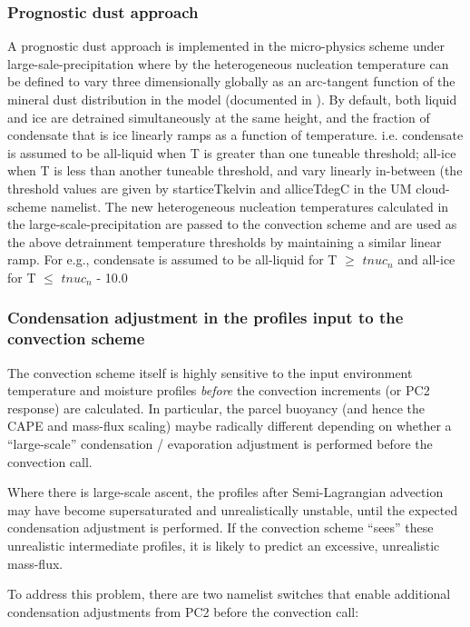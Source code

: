 \documentclass{UMDP_article}
\begin{document}
\subsubsection{Prognostic dust approach}
A prognostic dust approach is implemented in the micro-physics scheme under
large-sale-precipitation where by the heterogeneous nucleation temperature
can be defined to vary three dimensionally globally as an arc-tangent
function of the mineral dust distribution in the model (documented
in ). By default, both liquid and ice are detrained simultaneously at the same
height, and the fraction of condensate that is ice linearly ramps as a function of temperature.
i.e. condensate is assumed to be all-liquid when T is greater than one tuneable threshold; all-ice
when T is less than another tuneable threshold, and vary linearly in-between (the threshold values are
given by starticeTkelvin and alliceTdegC in the UM cloud-scheme namelist. The new heterogeneous
nucleation temperatures calculated in the large-scale-precipitation are passed to the convection
scheme and are used as the above detrainment temperature thresholds by
maintaining a similar linear ramp. For e.g., condensate is
assumed to be all-liquid for T $\geq$ $tnuc_n$ and all-ice for T
$\leq$ $tnuc_n$ - 10.0

\subsubsection{Condensation adjustment in the profiles input to the
convection scheme}
\label{sec:conv_input_profs}

The convection scheme itself is highly sensitive to the input environment
temperature and moisture profiles {\it before} the convection increments
(or PC2 response) are calculated.  In particular, the parcel buoyancy
(and hence the CAPE and mass-flux scaling) maybe radically different
depending on whether a ``large-scale'' condensation / evaporation adjustment
is performed before the convection call.

Where there is large-scale ascent, the profiles after Semi-Lagrangian advection
may have become supersaturated and unrealistically unstable, until the
expected condensation adjustment is performed.  If the convection scheme
``sees'' these unrealistic intermediate profiles, it is likely to
predict an excessive, unrealistic mass-flux.

To address this problem, there are two namelist switches that enable
additional condensation adjustments from PC2 before the convection call:
\end{document}
